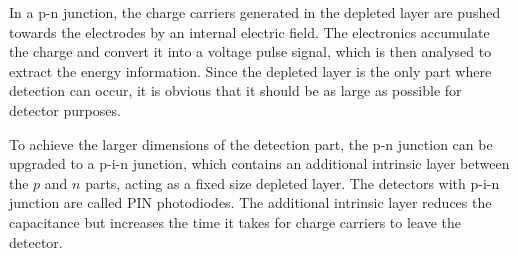 \par
In a p-n junction, the charge carriers generated in the depleted layer are pushed towards the electrodes by an internal electric field. The electronics accumulate the charge and convert it into a voltage pulse signal, which is then analysed to extract the energy information. Since the depleted layer is the only part where detection can occur, it is obvious that it should be as large as possible for detector purposes. 
\par
To achieve the larger dimensions of the detection part, the p-n junction can be upgraded to a p-i-n junction, which contains an additional intrinsic layer between the $p$ and $n$ parts, acting as a fixed size depleted layer. The detectors with p-i-n junction are called PIN photodiodes. The additional intrinsic layer reduces the capacitance but increases the time it takes for charge carriers to leave the detector.
%
%

